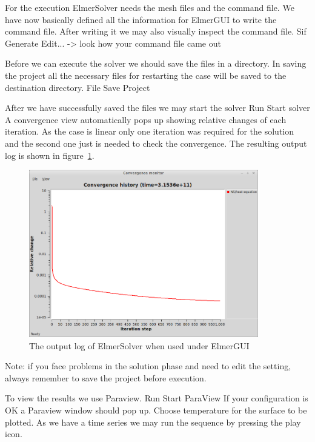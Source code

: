For the execution 
ElmerSolver needs the mesh files and the command file. We have now basically defined
all the information for ElmerGUI to write the command file. After writing it we may also visually 
inspect the command file.
\ttbegin
Sif
  Generate
  Edit... -> look how your command file came out  
\ttend

Before we can execute the solver we should save the files in a directory. In saving the project all the
necessary files for restarting the case will be saved to the destination directory.
\ttbegin
File 
  Save Project
\ttend

After we have successfully saved the files we may start the solver
\ttbegin
Run
  Start solver
\ttend
A convergence view automatically pops up showing relative changes of each iteration.
As the case is linear only one iteration was required for the solution and the second one
just is needed to check the convergence. 
The resulting output log is shown in figure~\ref{fg:GeoSlabConv}.

\begin{figure}
\begin{center}
\includegraphics[width=100mm]{GeoSlabConvergence}
\caption{The output log of ElmerSolver when used under ElmerGUI}\label{fg:GeoSlabConv}
\end{center}
\end{figure}

Note: if you face problems in the solution phase and need to edit the setting, always remember to save
the project before execution.

To view the results we use Paraview.
\ttbegin
Run
  Start ParaView
\ttend
If your configuration is OK a Paraview window should pop up.
Choose temperature for the surface to be plotted. 
As we have a time series we may run the sequence by pressing the play icon. 

